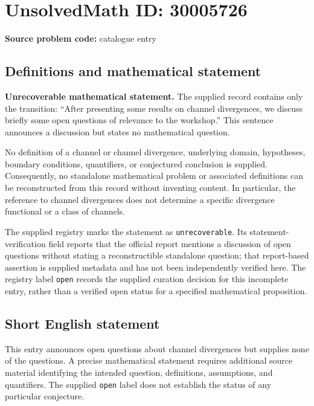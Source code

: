 \documentclass[11pt]{article}
\begin{document}
\section*{UnsolvedMath ID: 30005726}
\textbf{Source problem code:} catalogue entry
\subsection{Definitions and mathematical statement}
\textbf{Unrecoverable mathematical statement.} The supplied record contains only the transition: ``After presenting some results on channel divergences, we discuss briefly some open questions of relevance to the workshop.'' This sentence announces a discussion but states no mathematical question.

No definition of a channel or channel divergence, underlying domain, hypotheses, boundary conditions, quantifiers, or conjectured conclusion is supplied. Consequently, no standalone mathematical problem or associated definitions can be reconstructed from this record without inventing content. In particular, the reference to channel divergences does not determine a specific divergence functional or a class of channels.

The supplied registry marks the statement as \texttt{unrecoverable}. Its statement-verification field reports that the official report mentions a discussion of open questions without stating a reconstructible standalone question; that report-based assertion is supplied metadata and has not been independently verified here. The registry label \texttt{open} records the supplied curation decision for this incomplete entry, rather than a verified open status for a specified mathematical proposition.
\subsection{Short English statement}
This entry announces open questions about channel divergences but supplies none of the questions. A precise mathematical statement requires additional source material identifying the intended question, definitions, assumptions, and quantifiers. The supplied \texttt{open} label does not establish the status of any particular conjecture.
\end{document}
